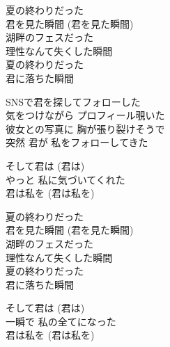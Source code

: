 \begin{lyrics}
\begin{japanese}
夏の終わりだった\\
君を見た瞬間 (君を見た瞬間)\\
湖畔のフェスだった\\
理性なんて失くした瞬間\\
夏の終わりだった\\
君に落ちた瞬間
\end{japanese}
\begin{japanese}
SNSで君を探してフォローした\\
気をつけながら プロフィール覗いた\\
彼女との写真に 胸が張り裂けそうで\\
突然 君が 私をフォローしてきた
\end{japanese}
\begin{japanese}
そして君は (君は)\\
やっと 私に気づいてくれた\\
君は私を (君は私を)
\end{japanese}
\begin{japanese}
夏の終わりだった\\
君を見た瞬間 (君を見た瞬間)\\
湖畔のフェスだった\\
理性なんて失くした瞬間\\
夏の終わりだった\\
君に落ちた瞬間
\end{japanese}
\begin{japanese}
そして君は (君は)\\
一瞬で 私の全てになった\\
君は私を (君は私を)
\end{japanese}
\end{lyrics}

